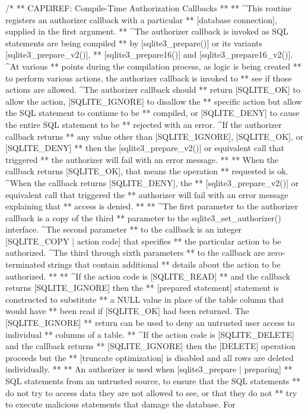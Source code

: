 \begin{Codex}[label=sqlite3.h,numbers=left]
{/*
** CAPI3REF: Compile-Time Authorization Callbacks
**
** ^This routine registers an authorizer callback with a particular
** [database connection], supplied in the first argument.
** ^The authorizer callback is invoked as SQL statements are being compiled
** by [sqlite3_prepare()] or its variants [sqlite3_prepare_v2()],
** [sqlite3_prepare16()] and [sqlite3_prepare16_v2()].  ^At various
** points during the compilation process, as logic is being created
** to perform various actions, the authorizer callback is invoked to
** see if those actions are allowed.  ^The authorizer callback should
** return [SQLITE_OK] to allow the action, [SQLITE_IGNORE] to disallow the
** specific action but allow the SQL statement to continue to be
** compiled, or [SQLITE_DENY] to cause the entire SQL statement to be
** rejected with an error.  ^If the authorizer callback returns
** any value other than [SQLITE_IGNORE], [SQLITE_OK], or [SQLITE_DENY]
** then the [sqlite3_prepare_v2()] or equivalent call that triggered
** the authorizer will fail with an error message.
**
** When the callback returns [SQLITE_OK], that means the operation
** requested is ok.  ^When the callback returns [SQLITE_DENY], the
** [sqlite3_prepare_v2()] or equivalent call that triggered the
** authorizer will fail with an error message explaining that
** access is denied. 
**
** ^The first parameter to the authorizer callback is a copy of the third
** parameter to the sqlite3_set_authorizer() interface. ^The second parameter
** to the callback is an integer [SQLITE_COPY | action code] that specifies
** the particular action to be authorized. ^The third through sixth parameters
** to the callback are zero-terminated strings that contain additional
** details about the action to be authorized.
**
** ^If the action code is [SQLITE_READ]
** and the callback returns [SQLITE_IGNORE] then the
** [prepared statement] statement is constructed to substitute
** a NULL value in place of the table column that would have
** been read if [SQLITE_OK] had been returned.  The [SQLITE_IGNORE]
** return can be used to deny an untrusted user access to individual
** columns of a table.
** ^If the action code is [SQLITE_DELETE] and the callback returns
** [SQLITE_IGNORE] then the [DELETE] operation proceeds but the
** [truncate optimization] is disabled and all rows are deleted individually.
**
** An authorizer is used when [sqlite3_prepare | preparing]
** SQL statements from an untrusted source, to ensure that the SQL statements
** do not try to access data they are not allowed to see, or that they do not
** try to execute malicious statements that damage the database.  For
}
\end{Codex}
